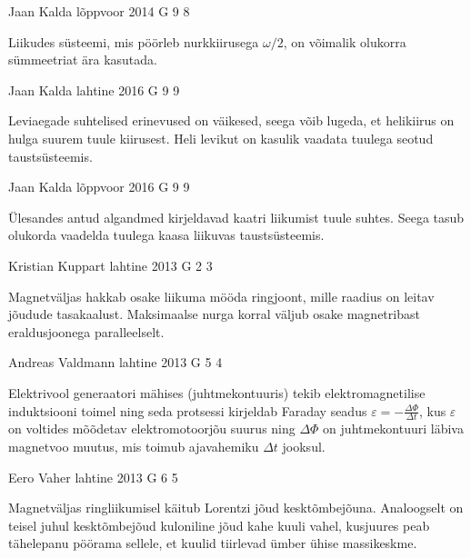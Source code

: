 \documentclass[11pt, twoside]{article}
\begin{document}
{%
{Jaan Kalda} %
{lõppvoor} %
{2014} %
{G 9} %
{8} %
{

\ifHint
Liikudes süsteemi, mis pöörleb nurkkiirusega $\omega/2$, on võimalik olukorra sümmeetriat ära kasutada.
\fi
}

{Jaan Kalda} %
{lahtine} %
{2016} %
{G 9} %
{9} %
{

\ifHint
Leviaegade suhtelised erinevused on väikesed, seega võib lugeda, et helikiirus on hulga suurem tuule kiirusest. Heli levikut on kasulik vaadata tuulega seotud taustsüsteemis.
\fi
}

{Jaan Kalda} %
{lõppvoor} %
{2016} %
{G 9} %
{9} %
{

\ifHint
Ülesandes antud algandmed kirjeldavad kaatri liikumist tuule suhtes. Seega tasub olukorda vaadelda tuulega kaasa liikuvas taustsüsteemis.
\fi
}

{Kristian Kuppart} %
{lahtine} %
{2013} %
{G 2} %
{3} %
{

\ifHint
Magnetväljas hakkab osake liikuma mööda ringjoont, mille raadius on leitav jõudude tasakaalust. Maksimaalse nurga korral väljub osake magnetribast eraldusjoonega paralleelselt.
\fi
}

{Andreas Valdmann} %
{lahtine} %
{2013} %
{G 5} %
{4} %
{

\ifHint
Elektrivool generaatori mähises (juhtmekontuuris) tekib elektromagnetilise induktsiooni toimel ning seda protsessi kirjeldab Faraday seadus $\varepsilon = -\frac{\Delta\Phi}{\Delta t}$, kus $\varepsilon$ on voltides mõõdetav elektromotoorjõu suurus ning $\Delta\Phi$ on juhtmekontuuri läbiva magnetvoo muutus, mis toimub ajavahemiku $\Delta t$ jooksul.
\fi
}

{Eero Vaher} %
{lahtine} %
{2013} %
{G 6} %
{5} %
{

\ifHint
Magnetväljas ringliikumisel käitub Lorentzi jõud kesktõmbejõuna. Analoogselt on teisel juhul kesktõmbejõud kuloniline jõud kahe kuuli vahel, kusjuures peab tähelepanu pöörama sellele, et kuulid tiirlevad ümber ühise massikeskme.
\fi
}

}
\end{document}
